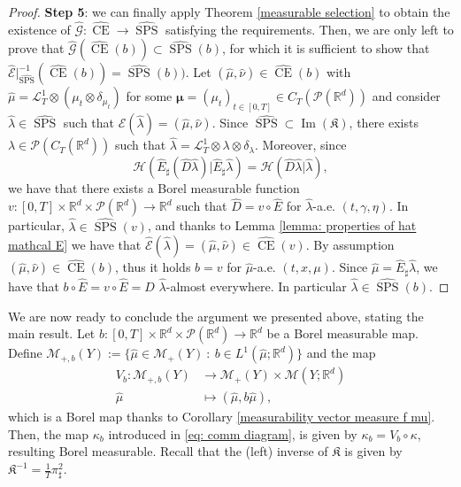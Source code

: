 \documentclass[10pt,leqno]{amsart}
\numberwithin{equation}{section}
\newcommand{\R}{\mathbb{R}}
\newcommand{\PP}{\mathcal{P}}
\newcommand{\CE}{\operatorname{CE}}
\begin{document}
\begin{proof}
    \textbf{Step 5}: we can finally apply Theorem \ref{measurable selection} to obtain the existence of $\hat{\mathcal{G}}:\hat{\operatorname{CE}} \to \hat{\operatorname{SPS}}$ satisfying the requirements. Then, we are only left to prove that $\hat{\mathcal{G}}(\hat{\CE}(b)) \subset \hat{\operatorname{SPS}}(b)$, for which it is sufficient to show that $\hat{\mathcal{E}} |_{\hat{\operatorname{SPS}}}^{-1} (\hat{\operatorname{CE}}(b)) = \hat{\operatorname{SPS}}(b))$. Let $(\hat{\mu},\hat{\nu}) \in \hat{\operatorname{CE}}(b)$ with $\hat{\mu} = \mathcal{L}^1_T\otimes(\mu_t \otimes \delta_{\mu_t})$ for some $\boldsymbol{\mu}= (\mu_t)_{t\in[0,T]} \in C_T(\PP(\R^d))$ and consider $\hat{\lambda} \in \hat{\operatorname{SPS}}$ such that $\hat{\mathcal{E}}(\hat{\lambda}) = (\hat{\mu},\hat{\nu})$. Since $\hat{\operatorname{SPS}}\subset \operatorname{Im}(\mathfrak{K})$, there exists $\lambda \in \PP(C_T(\R^d))$ such that $\hat{\lambda} = \mathcal{L}^1_T\otimes \lambda \otimes \delta_\lambda$. Moreover, since 
    \[\mathcal{H}\left( \hat{E}_\sharp (\hat{D}\hat{\lambda}) | \hat{E}_\sharp  \hat{\lambda} \right) = \mathcal{H}\left( \hat{D}\hat{\lambda}|  \hat{\lambda} \right),\]
    we have that there exists a Borel measurable function $v:[0,T]\times \R^d \times \PP(\R^d) \to \R^d$ such that $\hat{D} = v\circ \hat{E}$ for $\hat{\lambda}$-a.e. $(t,\gamma,\eta)$. In particular, $\hat{\lambda} \in \hat{\operatorname{SPS}}(v)$, and thanks to Lemma \ref{lemma: properties of hat mathcal E} we have that $\hat{\mathcal{E}}(\hat{\lambda}) = (\hat{\mu},\hat{\nu}) \in \hat{\operatorname{CE}}(v)$. By assumption $(\hat{\mu},\hat{\nu}) \in \hat{\operatorname{CE}}(b)$, thus it holds $b = v$ for $\hat{\mu}$-a.e. $(t,x,\mu)$. Since $\hat{\mu} = \hat{E}_\sharp \hat{\lambda}$, we have that $b\circ \hat{E} = v\circ \hat{E}=D$ $\hat{\lambda}$-almost everywhere. In particular $\hat{\lambda} \in \hat{\operatorname{SPS}}(b)$.
\end{proof}

We are now ready to conclude the argument we presented above, stating the main result.
Let $b:[0,T]\times \R^d \times \PP(\R^d) \to \R^d$ be a Borel measurable map. Define $\mathcal{M}_{+,b} (Y) := \big\{\hat{\mu} \in \mathcal{M}_+(Y) \ : \ b \in L^1(\hat{\mu};\R^d) \big\}$ and the map 
\begin{equation}
\begin{aligned}
    V_b: \mathcal{M}_{+,b} (Y) & \to \mathcal{M}_{+}(Y) \times \mathcal{M}(Y;\R^d)
    \\
    \hat{\mu} & \mapsto (\hat{\mu}, b \hat{\mu}),
\end{aligned}
\end{equation}
which is a Borel map thanks to Corollary \ref{measurability vector measure f mu}. Then, the map $\kappa_b$ introduced in \eqref{eq: comm diagram}, is given by $\kappa_b = V_b \circ \kappa$, resulting Borel measurable. Recall that the (left) inverse of $\mathfrak{K}$ is given by $\mathfrak{K}^{-1} = \frac{1}{T}\pi^2_\sharp $.
\end{document}
